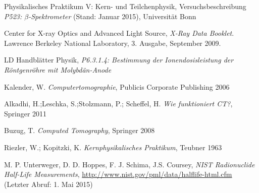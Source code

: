 \documentclass[11pt, a4paper]{article}
\numberwithin{equation}{section}
\begin{document}
\FloatBarrier
\vspace{\fill}
\begin{thebibliography}{19}
	Physikalisches Praktikum V: Kern- und Teilchenphysik,
	Versuchsbeschreibung \emph{P523: $\beta$-Spektrometer} (Stand: Januar 2015),
	Universität Bonn	

	Center for X-ray Optics and Advanced Light Source,
	\emph{X-Ray Data Booklet}.
	Lawrence Berkeley National Laboratory,
	3. Ausgabe,
	September 2009.

	LD Handblätter Physik,
	\emph{P6.3.1.4: Bestimmung der Ionendosisleistung der Röntgenröhre mit Molybdän-Anode}
	
	Kalender, W.
	\emph{Computertomographie},
	Publicis Corporate Publishing 2006
	
	Alkadhi, H.;Leschka, S.;Stolzmann, P.; Scheffel, H.
	\emph{Wie funktioniert CT?},
	Springer 2011
	
	Buzug, T.
	\emph{Computed Tomography},
	Springer 2008

	Riezler, W.; Kopitzki, K.
	\emph{Kernphysikalisches Praktikum},
	Teubner 1963

	M. P. Unterweger, D. D. Hoppes, F. J. Schima, J.S. Coursey,
	\emph{NIST Radionuclide Half-Life Measurements},
	\url{http://www.nist.gov/pml/data/halflife-html.cfm} (Letzter Abruf: 1. Mai 2015)

\end{thebibliography}
\end{document}
